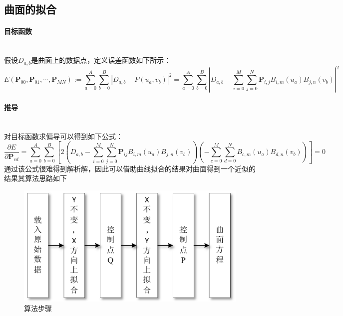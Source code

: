 \documentclass[10pt]{article}
\begin{document}
\subsection{曲面的拟合}
\paragraph{目标函数}\mbox{} \\
假设$D_{a,b}$是曲面上的数据点，定义误差函数如下所示：
$$
E(\bm{P}_{00},\bm{P}_{01},\cdots,\bm{P}_{MN}):=\displaystyle\sum_{a=0}^A\sum_{b=0}^B|D_{a,b}-P(u_a,v_b)|^2=\displaystyle\sum_{a=0}^A\sum_{b=0}^B|D_{a,b}-\sum_{i=0}^{M}\sum_{j=0}^{N}\bm{P}_{i,j}B_{i,m}(u_a)B_{j,n}(v_b)|^2
$$

\paragraph{推导}\mbox{} \\
对目标函数求偏导可以得到如下公式：
$$
\displaystyle\frac{\partial{E}}{\partial{\bm{P}_{cd}}}=\displaystyle\sum_{a=0}^{A}\sum_{b=0}^B
\left[
2\left(
D_{a,b}-\sum_{i=0}^M\sum_{j=0}^N\bm{P}_{ij}B_{i,m}(u_a)B_{j,n}(v_b)
\right)
\left(
-\sum_{c=0}^M\sum_{d=0}^NB_{c,m}(u_a)B_{d,n}(v_b)
\right)
\right]=0
$$
通过该公式很难得到解析解，因此可以借助曲线拟合的结果对曲面得到一个近似的结果其算法思路如下
\begin{figure}[H]
\begin{center}
\includegraphics[scale=0.4]{algorithm1.png}
\caption{算法步骤}
\end{center}
\end{figure}
\end{document}
